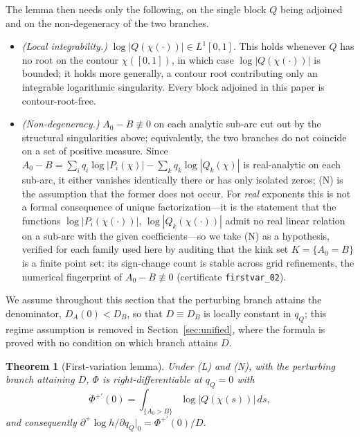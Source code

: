 \documentclass[11pt,reqno]{amsart}
\theoremstyle{plain}
\newtheorem{theorem}{Theorem}
\theoremstyle{definition}
\newcommand{\dplus}{\partial^{+}}
\newcommand{\dA}{D_A}
\newcommand{\dB}{D_B}
\begin{document}
The lemma then needs only the following, on the single block $Q$ being adjoined and on
the non-degeneracy of the two branches.
\begin{itemize}
\item[(L)] \emph{(Local integrability.)} $\log|Q(\chi(\cdot))|\in L^1[0,1]$. This holds
  whenever $Q$ has no root on the contour $\chi([0,1])$, in which case
  $\log|Q(\chi(\cdot))|$ is bounded; it holds more generally, a contour root
  contributing only an integrable logarithmic singularity. Every block adjoined in this
  paper is contour-root-free.
\item[(N)] \emph{(Non-degeneracy.)} $A_0-B\not\equiv0$ on each analytic sub-arc cut out
  by the structural singularities above; equivalently, the two branches do not coincide
  on a set of positive measure. Since $A_0-B=\sum_i q_i\log|P_i(\chi)|-\sum_k
  q_k\log|Q_k(\chi)|$ is real-analytic on each sub-arc, it either vanishes identically
  there or has only isolated zeros; (N) is the assumption that the former does not
  occur. For \emph{real} exponents this is not a formal consequence of unique
  factorization---it is the statement that the functions $\log|P_i(\chi(\cdot))|$,
  $\log|Q_k(\chi(\cdot))|$ admit no real linear relation on a sub-arc with the given
  coefficients---so we take (N) as a hypothesis, verified for each family used here by
  auditing that the kink set $K=\{A_0=B\}$ is a finite point set: its sign-change count
  is stable across grid refinements, the numerical fingerprint of $A_0-B\not\equiv0$
  (certificate \texttt{firstvar\_02}).
\end{itemize}
We assume throughout this section that the perturbing branch attains the denominator,
$\dA(0)<\dB$, so that $D\equiv\dB$ is locally constant in $q_Q$; this regime
assumption is removed in Section~\ref{sec:unified}, where the formula is proved with no
condition on which branch attains $D$.

\begin{theorem}[First-variation lemma]\label{thm:firstvar}
Under \emph{(L)} and \emph{(N)}, with the perturbing branch attaining $D$, $\Phi$ is
right-differentiable at $q_Q=0$ with
\begin{equation}\label{eq:Phiprime}
  \Phi^{+\prime}(0)=\int_{\{A_0>B\}}\log|Q(\chi(s))|\,ds,
\end{equation}
and consequently $\dplus\!\log h/\partial q_Q|_0=\Phi^{+\prime}(0)/D$.
\end{theorem}
\end{document}
